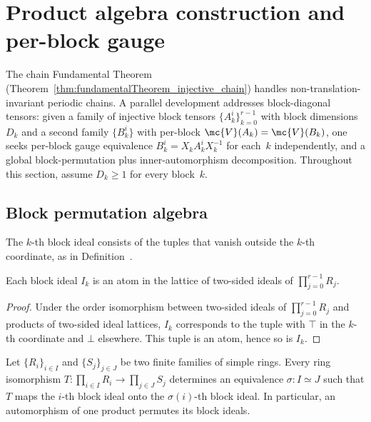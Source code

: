 \section{Product algebra construction and per-block gauge}%
\label{sec:pi_algebra}

The chain Fundamental Theorem
(Theorem~\ref{thm:fundamentalTheorem_injective_chain}) handles
non-translation-invariant periodic chains.
A parallel development addresses block-diagonal tensors:
given a family of injective block tensors $\{A_k^i\}_{k=0}^{r-1}$
with block dimensions $D_k$ and a second family $\{B_k^i\}$ with
per-block $\mc{V}(A_k) = \mc{V}(B_k)$, one seeks per-block gauge
equivalence $B_k^i = X_k A_k^i X_k^{-1}$ for each~$k$
independently, and a global block-permutation plus inner-automorphism
decomposition.
Throughout this section, assume $D_k \ge 1$ for every block~$k$.

\subsection{Block permutation algebra}

The $k$-th block ideal consists of the tuples that vanish outside the
$k$-th coordinate, as in Definition~\cite[``Block ideal'']{QICLean2026Blueprint}.

\begin{lemma}\label{thm:block_ideal_atom}
    \leanok

    Each block ideal $I_k$ is an atom in the lattice of two-sided ideals of
    $\prod_{j=0}^{r-1} R_j$.
\end{lemma}

\begin{proof}
    \leanok
    Under the order isomorphism between two-sided ideals of
    $\prod_{j=0}^{r-1} R_j$
    and products of two-sided ideal lattices, $I_k$ corresponds to the tuple with
    $\top$ in the $k$-th coordinate and $\bot$ elsewhere. This tuple is an atom,
    hence so is $I_k$.
\end{proof}

\begin{lemma}\label{thm:ring_perm}
    \leanok

    Let $\{R_i\}_{i\in I}$ and $\{S_j\}_{j\in J}$ be two finite families of
    simple rings. Every ring isomorphism
    $T : \prod_{i\in I}R_i \to \prod_{j\in J}S_j$ determines an equivalence
    $\sigma:I\simeq J$ such that $T$ maps the $i$-th block ideal onto the
    $\sigma(i)$-th block ideal. In particular, an automorphism of one product
    permutes its block ideals.
\end{lemma}

